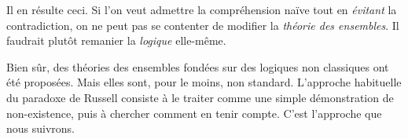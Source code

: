 \documentclass[../../../include/open-logic-section]{subfiles}
\begin{document}
Il en résulte ceci. Si l'on veut admettre la compréhension naïve tout
en \emph{évitant} la contradiction, on ne peut pas se contenter de
modifier la \emph{théorie des ensembles}. Il faudrait plutôt remanier
la \emph{logique} elle-même.

Bien sûr, des théories des ensembles fondées sur des logiques non
classiques ont été proposées. Mais elles sont, pour le moins, non
standard. L'approche habituelle du paradoxe de Russell consiste à le
traiter comme une simple démonstration de non-existence, puis à
chercher comment en tenir compte. C'est l'approche que nous suivrons.
\end{document}
